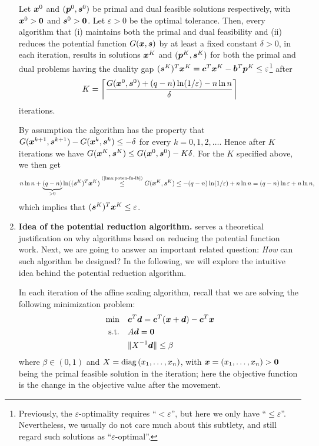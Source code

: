 \begin{enumerate}
\begin{theorem}
\label{thm:poten-redu-iter-num}
Let \(\bm{x}^{0}\) and \((\bm{p}^{0},\bm{s}^{0})\) be primal and dual
feasible solutions respectively, with \(\bm{x}^{0}>\bm{0}\) and
\(\bm{s}^{0}>\bm{0}\). Let \(\varepsilon>0\) be the optimal tolerance.
Then, every algorithm that (i) maintains both the primal and dual feasibility
and (ii) reduces the potential function \(G(\bm{x},\bm{s})\) by at least a
fixed constant \(\delta>0\), in each iteration, results in solutions
\(\bm{x}^{K}\) and \((\bm{p}^{K},\bm{s}^{K})\) for both the primal and
dual problems having the duality gap
\((\bm{s}^{K})^{T}\bm{x}^{K}=\bm{c}^{T}\bm{x}^{K}
-\bm{b}^{T}\bm{p}^{K}\le\varepsilon\)\footnote{Previously, the
\(\varepsilon\)-optimality requires ``\(<\varepsilon\)'', but here we only have
``\(\le\varepsilon\)''. Nevertheless, we usually do not care much about this
subtlety, and still regard such solutions as ``\(\varepsilon\)-optimal''.} after
\[
K=\left\lceil
\frac{G(\bm{x}^{0},\bm{s}^{0})+(q-n)\ln(1/\varepsilon)-n\ln n}{\delta}
\right\rceil
\]
iterations.
\end{theorem}
\begin{pf}
By assumption the algorithm has the property that
\(G(\bm{x}^{k+1},\bm{s}^{k+1})-G(\bm{x}^{k},\bm{s}^{k})\le -\delta\) for
every \(k=0,1,2,\dotsc\). Hence after \(K\) iterations we have
\(G(\bm{x}^{K},\bm{s}^{K})\le G(\bm{x}^{0},\bm{s}^{0})-K\delta\). For
the \(K\) specified above, we then get
\[
n\ln n+\underbrace{(q-n)}_{>0}\ln((\vect{s}^{K})^{T}\vect{x}^{K})
\overset{\text{(\Cref{lma:poten-fn-lb})}}{\le}
G(\vect{x}^{K},\vect{s}^{K})\le -(q-n)\ln(1/\varepsilon)+n\ln n
=(q-n)\ln\varepsilon+n\ln n,
\]
which implies that \((\bm{s}^{K})^{T}\bm{x}^{K}\le \varepsilon\).
\end{pf}
\item\label{it:poten-redu-idea} \textbf{Idea of the potential reduction
algorithm.}  serves a theoretical justification
on why algorithms based on reducing the potential function work. Next, we are
going to answer an important related question: \emph{How} can such algorithm be
designed? In the following, we will explore the intuitive idea behind the
potential reduction algorithm.

In each iteration of the affine scaling algorithm, recall that we are solving
the following minimization problem:
\begin{align*}
\text{min}\quad&\bm{c}^{T}\bm{d}
=\bm{c}^{T}(\bm{x}+\bm{d})-\bm{c}^{T}\bm{x} \\
\text{s.t.}\quad&A\bm{d}=\bm{0} \\
&\|X^{-1}\bm{d}\|\le\beta
\end{align*}
where \(\beta\in(0,1)\) and \(X=\operatorname{diag}\left(x_1,\dotsc,x_n\right)\), with
\(\bm{x}=(x_1,\dotsc,x_n)>\bm{0}\) being the primal feasible solution in
the iteration; here the objective function is the change in the objective value
after the movement.


\end{enumerate}
